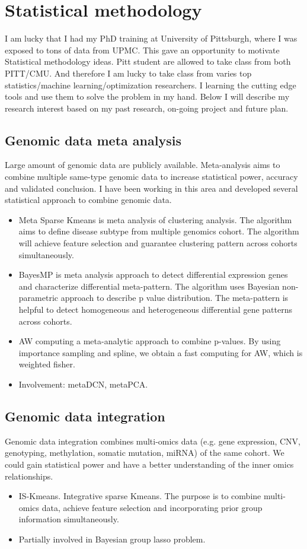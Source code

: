 \documentclass[a4paper, 10pt]{article}
\begin{document}
\section{Statistical methodology}
I am lucky that I had my PhD training at University of Pittsburgh,
where I was exposed to tons of data from UPMC.
This gave an opportunity to motivate Statistical methodology ideas.
Pitt student are allowed to take class from both PITT/CMU. 
And therefore I am lucky to take class from varies top statistics/machine learning/optimization researchers.
I learning the cutting edge tools and use them to solve the problem in my hand.
Below I will describe my research interest based on my past research, on-going project and future plan.


\subsection{Genomic data meta analysis}
Large amount of genomic data are publicly available.
Meta-analysis aims to combine multiple same-type genomic data to increase statistical power, accuracy and validated conclusion.
I have been working in this area and developed several statistical approach to combine genomic data.
\begin{itemize}
\item Meta Sparse Kmeans is meta analysis of clustering analysis. 
The algorithm aims to define disease subtype from multiple genomics cohort.
The algorithm will achieve feature selection and guarantee clustering pattern across cohorts simultaneously.
\item BayesMP is meta analysis approach to detect differential expression genes and characterize differential meta-pattern. 
The algorithm uses Bayesian non-parametric approach to describe p value distribution. 
The meta-pattern is helpful to detect homogeneous and heterogeneous differential gene patterns across cohorts.
\item AW computing a meta-analytic approach to combine p-values.
By using importance sampling and spline, 
we obtain a fast computing for AW, which is weighted fisher.
\item Involvement: metaDCN, metaPCA.
\end{itemize}

\subsection{Genomic data integration}
Genomic data integration combines multi-omics data 
(e.g. gene expression, CNV, genotyping, methylation, somatic mutation, miRNA) of the same cohort.
We could gain statistical power and have a better understanding of the inner omics relationships.
\begin{itemize}
\item IS-Kmeans. Integrative sparse Kmeans.
The purpose is to combine multi-omics data, achieve feature selection and incorporating prior group information simultaneously.
\item Partially involved in Bayesian group lasso problem.
\end{itemize}
\end{document}
